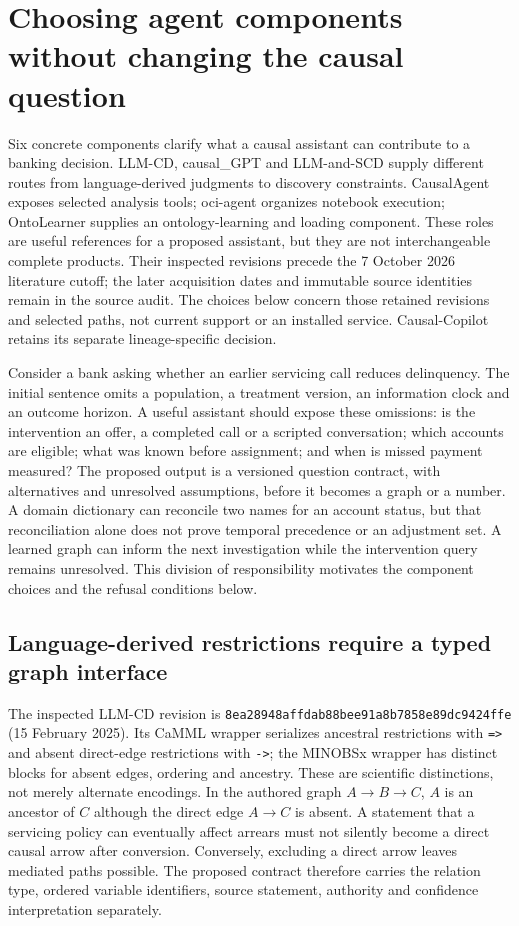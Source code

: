 \section{Choosing agent components without changing the causal question}
\label{sec:exec25-agents-reuse}
Six concrete components clarify what a causal assistant can contribute to a
banking decision. LLM-CD, causal\_GPT and LLM-and-SCD supply different routes
from language-derived judgments to discovery constraints. CausalAgent exposes
selected analysis tools; oci-agent organizes notebook execution; OntoLearner
supplies an ontology-learning and loading component. These roles are useful
references for a proposed assistant, but they are not interchangeable complete
products. Their inspected revisions precede the 7 October 2026 literature cutoff;
the later acquisition dates and immutable source identities remain in the
source audit. The choices below concern those retained revisions and selected
paths, not current support or an installed service. Causal-Copilot retains its
separate lineage-specific decision.\citep{exec14_iid_cd,exec14_iid_gpt,exec14_iid_scd,exec13_data_causalagent_code,exec13_data_oci_code,exec13_data_ontolearner_code}

Consider a bank asking whether an earlier servicing call reduces delinquency.
The initial sentence omits a population, a treatment version, an information
clock and an outcome horizon. A useful assistant should expose these omissions:
is the intervention an offer, a completed call or a scripted conversation;
which accounts are eligible; what was known before assignment; and when is
missed payment measured? The proposed output is a versioned question contract,
with alternatives and unresolved assumptions, before it becomes a graph or a
number. A domain dictionary can reconcile two names for an account status, but
that reconciliation alone does not prove temporal precedence or an adjustment
set. A learned graph can inform the next investigation while the intervention
query remains unresolved. This division of responsibility motivates the
component choices and the refusal conditions below.\citep{exec25_agents_choice}

\subsection{Language-derived restrictions require a typed graph interface}
The inspected LLM-CD revision is
\texttt{8ea28948affdab88bee91}\allowbreak\texttt{a8b7858e89dc9424ffe}
(15 February 2025). Its CaMML wrapper serializes ancestral restrictions with
\texttt{=>} and absent direct-edge restrictions with \texttt{->}; the MINOBSx
wrapper has distinct blocks for absent edges, ordering and ancestry. These are
scientific distinctions, not merely alternate encodings. In the authored graph
$A\to B\to C$, $A$ is an ancestor of $C$ although the direct edge $A\to C$ is
absent. A statement that a servicing policy can eventually affect arrears must
not silently become a direct causal arrow after conversion. Conversely,
excluding a direct arrow leaves mediated paths possible. The proposed contract
therefore carries the relation type, ordered variable identifiers, source
statement, authority and confidence interpretation separately.\citep{exec14_iid_cd,exec25_agents_choice}

